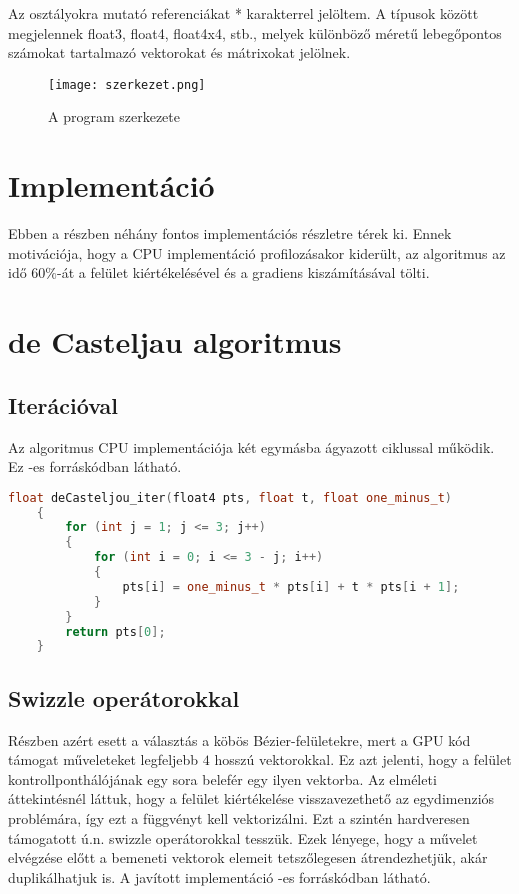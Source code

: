 Az osztályokra mutató referenciákat * karakterrel jelöltem. A típusok között megjelennek float3, float4, float4x4, stb., melyek különböző méretű lebegőpontos számokat tartalmazó vektorokat és mátrixokat jelölnek.

\begin{figure}
	\centering
	\texttt{[image: szerkezet.png]}
	\caption{A program szerkezete}
	\label{fig:szerkezet}
\end{figure}




\section{Implementáció}

Ebben a részben néhány fontos implementációs részletre térek ki. Ennek motivációja, hogy a CPU implementáció profilozásakor kiderült, az algoritmus az idő $60\%$-át a felület kiértékelésével és a gradiens kiszámításával tölti.

\section{de Casteljau algoritmus}
\subsection{Iterációval}
Az algoritmus CPU implementációja két egymásba ágyazott ciklussal működik. Ez -es forráskódban látható.

\begin{lstlisting}[caption={de Casteljau iterációval}, language={C++}, label={lst:iter}]
	float deCasteljou_iter(float4 pts, float t, float one_minus_t)
	{
		for (int j = 1; j <= 3; j++)
		{
			for (int i = 0; i <= 3 - j; i++)
			{
				pts[i] = one_minus_t * pts[i] + t * pts[i + 1];
			}
		}
		return pts[0];
	}
\end{lstlisting}

\subsection{Swizzle operátorokkal}
Részben azért esett a választás a köbös Bézier-felületekre, mert a GPU kód támogat műveleteket legfeljebb $4$ hosszú vektorokkal. Ez azt jelenti, hogy a felület kontrollponthálójának egy sora belefér egy ilyen vektorba. Az elméleti áttekintésnél láttuk, hogy a felület kiértékelése visszavezethető az egydimenziós problémára, így ezt a függvényt kell vektorizálni. Ezt a szintén hardveresen támogatott ú.n. swizzle operátorokkal tesszük. Ezek lényege, hogy a művelet elvégzése előtt a bemeneti vektorok elemeit tetszőlegesen átrendezhetjük, akár duplikálhatjuk is. A javított implementáció -es forráskódban látható.

